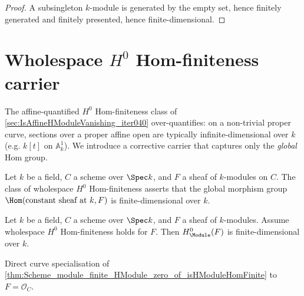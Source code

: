 \begin{proof}
  
  \leanok
  A subsingleton \(k\)-module is generated by the empty set, hence finitely generated and finitely presented, hence finite-dimensional.
\end{proof}


\section{Wholespace \(H^0\) Hom-finiteness carrier}
\label{sec:IsHModuleHomFinite_iter043}

The affine-quantified \(H^0\) Hom-finiteness class of \cref{sec:IsAffineHModuleVanishing_iter040} over-quantifies: on a non-trivial proper curve, sections over a proper affine open are typically infinite-dimensional over \(k\) (e.g. \(k[t]\) on \(\mathbb A^1_k\)). We introduce a corrective carrier that captures only the \emph{global} Hom group.

\begin{definition}
  \label{thm:Scheme_IsHModuleHomFinite}
  
  Let \(k\) be a field, \(C\) a scheme over \(\Spec k\), and \(F\) a sheaf of \(k\)-modules on \(C\). The class of wholespace \(H^0\) Hom-finiteness asserts that the global morphism group \(\Hom(\text{constant sheaf at }k, F)\) is finite-dimensional over \(k\).
\end{definition}

\begin{theorem}
  \label{thm:Scheme_module_finite_HModule_zero_of_isHModuleHomFinite}
  Let \(k\) be a field, \(C\) a scheme over \(\Spec k\), and \(F\) a sheaf of \(k\)-modules. Assume wholespace \(H^0\) Hom-finiteness holds for \(F\). Then \(H^0_{\Module}(F)\) is finite-dimensional over \(k\).
\end{theorem}

\begin{theorem}
  \label{thm:Scheme_module_finite_HModule_zero_of_isHModuleHomFinite_curve}
  Direct curve specialisation of \cref{thm:Scheme_module_finite_HModule_zero_of_isHModuleHomFinite} to \(F = \mathcal O_C\).
\end{theorem}

